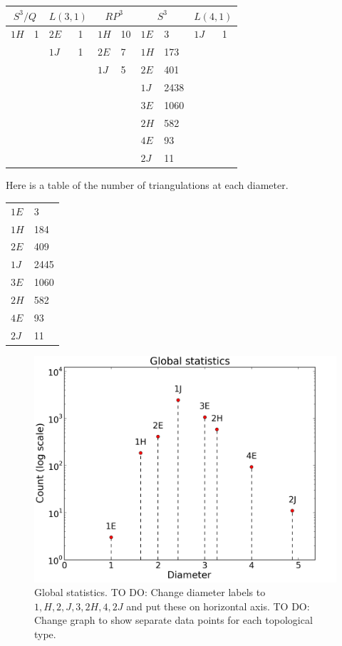 \documentclass[12pt]{article}
\begin{document}
\begin{tabular} {| l l | l l | l l | l l | l l |}
\hline
\multicolumn{2}{|c|}{$S^{3}/Q$} &
\multicolumn{2}{|c|}{$L(3,1)$} &
\multicolumn{2}{|c|}{$RP^{3}$} &
\multicolumn{2}{|c|}{$S^{3}$} &
\multicolumn{2}{|c|}{$L(4,1)$} \\
\hline
\hline
$1H$&1    &$2E$&1    &$1H$&10    &$1E$&3    &$1J$&1 \\
  &       &$1J$&1    &$2E$&7     &$1H$&173  &    &  \\
  &       &  &       &$1J$&5     &$2E$&401  &    &  \\
  &       &  &       &    &      &$1J$&2438 &    &  \\
  &       &  &       &    &      &$3E$&1060 &    &  \\
  &       &  &       &    &      &$2H$&582  &    &  \\
  &       &  &       &    &      &$4E$&93   &    &  \\
  &       &  &       &    &      &$2J$&11   &    &  \\
\hline
\end{tabular}\vspace{.1in}

\noindent Here is a table of the number of triangulations at each diameter. \vspace{.1in}

\begin{tabular} {| l l |}
\hline
$1E$ &       3\\
$1H$ &       184\\
$2E$ &       409\\
$1J$ &       2445\\
$3E$ &       1060\\
$2H$ &       582\\
$4E$ &       93\\
$2J$ &       11\\
\hline
\end{tabular}


\begin{figure}
    \begin{center}
    \includegraphics[width=0.6\linewidth]{figures/global_statistics.png}
    \caption{Global statistics. TO DO: Change diameter labels to $1, H, 2, J, 3, 2H, 4, 2J$ and put these on horizontal axis. TO DO: Change graph to show separate data points for each topological type. }
    \end{center}
    \label{global_statistics}
\end{figure}
\end{document}
